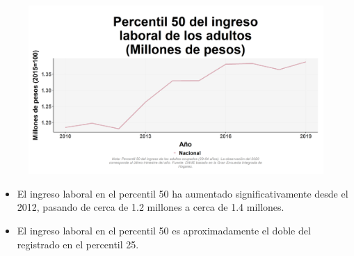     \begin{figure}[H]
        \caption[Percentil 50 del ingreso laboral de los adultos a nivel nacional ]{\label{inglab50adu_nal_trend} }
        \begin{center}
        \includegraphics[width=\textwidth,keepaspectratio]{img/var_20_trend.png}
        \end{center}
    \end{figure}
            \begin{itemize}
                \item El ingreso laboral en el percentil 50 ha aumentado significativamente desde el 2012, pasando de cerca de 1.2 millones a cerca de 1.4 millones.
                \item El ingreso laboral en el percentil 50 es aproximadamente el doble del registrado en el percentil 25.
                \end{itemize}

